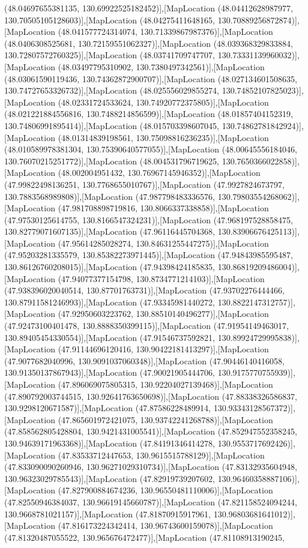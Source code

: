 (48.04697655381135, 130.69922525182452)],[MapLocation (48.04412628987977, 130.70505105128603)],[MapLocation (48.04275411648165, 130.70889256872874)],[MapLocation (48.041577724314074, 130.71339867987376)],[MapLocation (48.0406308525681, 130.72159551062327)],[MapLocation (48.039368329833884, 130.72807572760325)],[MapLocation (48.03741709747707, 130.73331139960032)],[MapLocation (48.03497795310902, 130.7380497342561)],[MapLocation (48.03061590119436, 130.74362872900707)],[MapLocation (48.027134601508635, 130.74727653326732)],[MapLocation (48.025556029855274, 130.74852107825023)],[MapLocation (48.02331724533624, 130.74920772375805)],[MapLocation (48.021221884556816, 130.7488214856599)],[MapLocation (48.01857404152319, 130.74806991895414)],[MapLocation (48.015703398607045, 130.74862781842924)],[MapLocation (48.01314839198561, 130.75098816236235)],[MapLocation (48.010589978381304, 130.75390640577055)],[MapLocation (48.00645556184046, 130.76070215251772)],[MapLocation (48.004531796719625, 130.7650366022858)],[MapLocation (48.002004951432, 130.76967145946352)],[MapLocation (47.99822498136251, 130.7768655010767)],[MapLocation (47.9927824673797, 130.7883568989808)],[MapLocation (47.987798483336576, 130.79803554268062)],[MapLocation (47.981708898719816, 130.8066337338858)],[MapLocation (47.97530125614755, 130.8166547324231)],[MapLocation (47.968197528858475, 130.82779071607135)],[MapLocation (47.96116445704368, 130.83906676425113)],[MapLocation (47.95614285028274, 130.84631255447275)],[MapLocation (47.95203281335579, 130.85382273971445)],[MapLocation (47.94843985595487, 130.86126760208015)],[MapLocation (47.94398424185835, 130.86819209486004)],[MapLocation (47.94077377154798, 130.8734771214103)],[MapLocation (47.938396020040514, 130.87701763731)],[MapLocation (47.93702276444466, 130.87911581246993)],[MapLocation (47.93345981440272, 130.8822147312757)],[MapLocation (47.92950603223762, 130.88510140496277)],[MapLocation (47.92473100401478, 130.8888350399115)],[MapLocation (47.91954149463017, 130.89405454330554)],[MapLocation (47.91546737592821, 130.89924729995838)],[MapLocation (47.91144696120416, 130.90422181413297)],[MapLocation (47.9077682040996, 130.9091037060348)],[MapLocation (47.90446140416058, 130.91350137867943)],[MapLocation (47.90021905444706, 130.9175770755939)],[MapLocation (47.896069075805315, 130.92204027139468)],[MapLocation (47.890792003744515, 130.92641763650698)],[MapLocation (47.88338326586837, 130.9298120671587)],[MapLocation (47.87586228489914, 130.93343128567372)],[MapLocation (47.865601972421075, 130.93742241268788)],[MapLocation (47.858562805428804, 130.9421431005541)],[MapLocation (47.852947552358245, 130.94639171963368)],[MapLocation (47.84191346414278, 130.9553717692426)],[MapLocation (47.83533712447653, 130.9615515788129)],[MapLocation (47.833090090260946, 130.96271029310734)],[MapLocation (47.83132935604948, 130.96323029785543)],[MapLocation (47.82919739207602, 130.96460358887106)],[MapLocation (47.827900884674236, 130.96550481110006)],[MapLocation (47.82550946384037, 130.96619145660787)],[MapLocation (47.821158524094244, 130.9668781021157)],[MapLocation (47.81870915917961, 130.96803681641012)],[MapLocation (47.816173224342414, 130.96743600159078)],[MapLocation (47.81320487055522, 130.965676472477)],[MapLocation (47.81108913190245, 